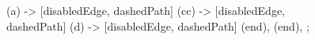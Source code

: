 \documentclass[../article.tex]{subfiles}
\begin{document}
\begin{figure}
\begin{styledtikz}
\begin{scope}[local bounding box=graph1, spring layout]
{                (a) -> [disabledEdge, dashedPath] (cc) -> [disabledEdge, dashedPath] (d) -> [disabledEdge, dashedPath] (end),
                (end),
            };
        \end{scope}


\end{styledtikz}
\end{figure}
\end{document}
